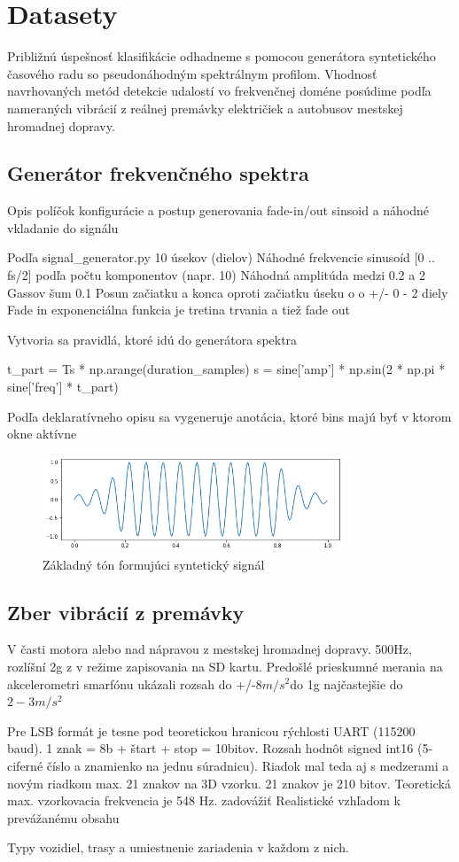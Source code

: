 \section{Datasety}
Približnú úspešnosť klasifikácie odhadneme s pomocou generátora syntetického časového radu so pseudonáhodným spektrálnym profilom.
Vhodnosť navrhovaných metód detekcie udalostí vo frekvenčnej doméne posúdime podľa nameraných vibrácií z reálnej
premávky električiek a autobusov mestskej hromadnej dopravy.

\subsection{Generátor frekvenčného spektra}
Opis políčok konfigurácie a postup generovania fade-in/out sinsoid a náhodné vkladanie do signálu

Podľa signal\_generator.py
10 úsekov (dielov)
Náhodné frekvencie sinusoíd [0 .. fs/2] podľa počtu komponentov (napr. 10)
Náhodná amplitúda medzi 0.2 a 2
Gassov šum 0.1
Posun začiatku a konca oproti začiatku úseku o o +/- 0 - 2 diely
Fade in exponenciálna funkcia je tretina trvania a tiež fade out

Vytvoria sa pravidlá, ktoré idú do generátora spektra 

t\_part = Ts * np.arange(duration\_samples)
s = sine['amp'] * np.sin(2 * np.pi * sine['freq'] * t_part)
        
Podľa deklaratívneho opisu sa vygeneruje anotácia, ktoré bins majú byť v ktorom okne aktívne

\begin{figure}[h]
   \centering
    \includegraphics[width=0.8\textwidth]{figures/verification/fade-in-sinusoid.png}
   \caption{Základný tón formujúci syntetický signál}
\end{figure} 

\subsection{Zber vibrácií z premávky}
V časti motora alebo nad nápravou z mestskej hromadnej dopravy. 500Hz, rozlíšní 2g z v režime zapisovania na SD kartu.
Predošlé prieskumné merania na akcelerometri smarfónu ukázali rozsah do +/-$8 m/s^2$do 1g najčastejšie do $2 - 3 m/s^2$

Pre LSB formát je tesne pod teoretickou hranicou rýchlosti UART (115200 baud). 1 znak = 8b + štart + stop = 10bitov.
Rozsah hodnôt signed int16 (5-ciferné číslo a znamienko na jednu súradnicu). Riadok mal teda aj s medzerami a novým riadkom max.
21 znakov na 3D vzorku. 21 znakov je 210 bitov. Teoretická max. vzorkovacia frekvencia je 548 Hz.
zadovážiť
Realistické vzhľadom k prevážanému obsahu

Typy vozidiel, trasy a umiestnenie zariadenia v každom z nich.


